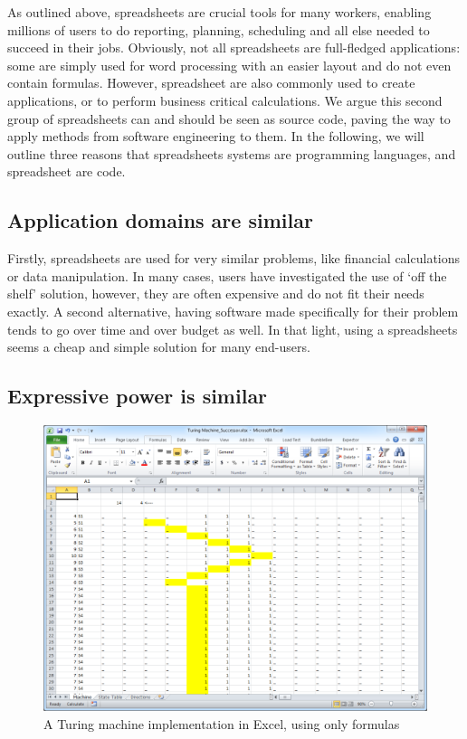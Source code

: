 \documentclass[conference]{IEEEtran}
\begin{document}
As outlined above, spreadsheets are crucial tools for many workers, enabling millions of users to do reporting, planning, scheduling and all else needed to succeed in their jobs. Obviously, not all spreadsheets are full-fledged applications: some are simply used for word processing with an easier layout and do not even contain formulas. However, spreadsheet are also commonly used to create applications, or to perform business critical calculations. We argue this second group of spreadsheets can and should be seen as source code, paving the way to apply methods from software engineering to them. In the following, we will outline three reasons that spreadsheets systems are programming languages, and spreadsheet are code.

\subsection{Application domains are similar}
Firstly, spreadsheets are used for very similar problems, like financial calculations or data manipulation. In many cases, users have investigated the use of ‘off the shelf’ solution, however, they are often expensive and do not fit their needs exactly. A second alternative, having software made specifically for their problem tends to go over time and over budget as well. In that light, using a spreadsheets seems a cheap and simple solution for many end-users.

\subsection{Expressive power is similar}

\begin{figure}
  \begin{center}
  \includegraphics[width=\columnwidth]{fig/turing.png}
  \caption{A Turing machine implementation in Excel, using only formulas}
  \label{fig:visical}
  \end{center}
\end{figure} 
\end{document}
